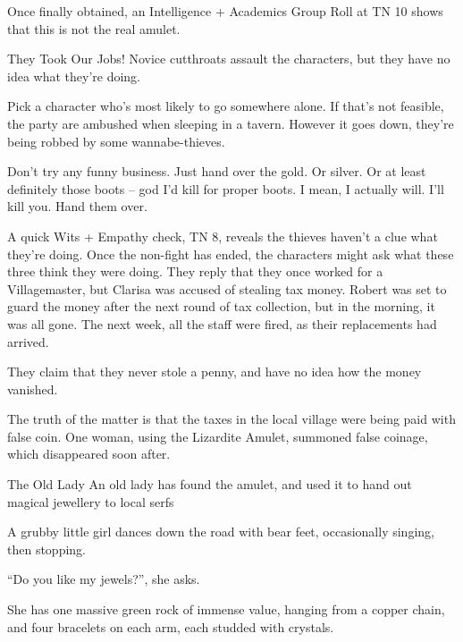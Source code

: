 \begin{multicols}{2}
Once finally obtained, an Intelligence + Academics Group Roll at TN 10 shows that this is not the real amulet.

{They Took Our Jobs!}%
{Novice cutthroats assault the characters, but they have no idea what they're doing.}%

Pick a character who's most likely to go somewhere alone.  If that's not feasible, the party are ambushed when sleeping in a tavern.
However it goes down, they're being robbed by some wannabe-thieves.

\begin{speechtext}

  Don't try any funny business.  Just hand over the gold. Or silver.  Or at least definitely those boots -- god I'd kill for proper boots.  I mean, I actually will.  I'll kill you.  Hand them over.

\end{speechtext}

A quick Wits + Empathy check, TN 8, reveals the thieves haven't a clue what they're doing.
Once the non-fight has ended, the characters might ask what these three think they were doing.
They reply that they once worked for a Villagemaster, but Clarisa was accused of stealing tax money.
Robert was set to guard the money after the next round of tax collection, but in the morning, it was all gone.
The next week, all the staff were fired, as their replacements had arrived.

They claim that they never stole a penny, and have no idea how the money vanished.

The truth of the matter is that the taxes in the local village were being paid with false coin.
One woman, using the Lizardite Amulet, summoned false coinage, which disappeared soon after.



{The Old Lady}%
{An old lady has found the amulet, and used it to hand out magical jewellery to local serfs}%

\begin{boxtext}
  A grubby little girl dances down the road with bear feet, occasionally singing, then stopping.

    ``Do you like my jewels?'', she asks.

  She has one massive green rock of immense value, hanging from a copper chain, and four bracelets on each arm, each studded with crystals.
\end{boxtext}


\end{multicols}
